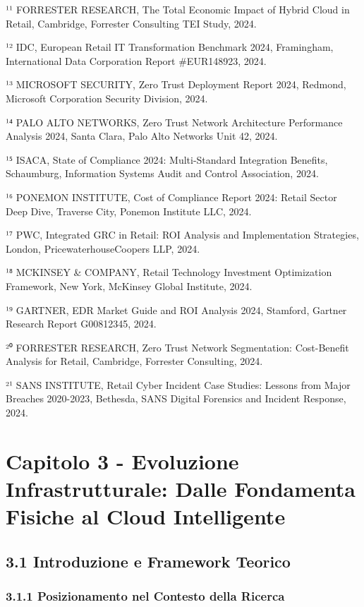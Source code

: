 \documentclass{report}
\begin{document}
¹¹ FORRESTER RESEARCH, The Total Economic Impact of Hybrid Cloud in
Retail, Cambridge, Forrester Consulting TEI Study, 2024.

¹² IDC, European Retail IT Transformation Benchmark 2024, Framingham,
International Data Corporation Report \#EUR148923, 2024.

¹³ MICROSOFT SECURITY, Zero Trust Deployment Report 2024, Redmond,
Microsoft Corporation Security Division, 2024.

¹⁴ PALO ALTO NETWORKS, Zero Trust Network Architecture Performance
Analysis 2024, Santa Clara, Palo Alto Networks Unit 42, 2024.

¹⁵ ISACA, State of Compliance 2024: Multi-Standard Integration Benefits,
Schaumburg, Information Systems Audit and Control Association, 2024.

¹⁶ PONEMON INSTITUTE, Cost of Compliance Report 2024: Retail Sector Deep
Dive, Traverse City, Ponemon Institute LLC, 2024.

¹⁷ PWC, Integrated GRC in Retail: ROI Analysis and Implementation
Strategies, London, PricewaterhouseCoopers LLP, 2024.

¹⁸ MCKINSEY \& COMPANY, Retail Technology Investment Optimization
Framework, New York, McKinsey Global Institute, 2024.

¹⁹ GARTNER, EDR Market Guide and ROI Analysis 2024, Stamford, Gartner
Research Report G00812345, 2024.

²⁰ FORRESTER RESEARCH, Zero Trust Network Segmentation: Cost-Benefit
Analysis for Retail, Cambridge, Forrester Consulting, 2024.

²¹ SANS INSTITUTE, Retail Cyber Incident Case Studies: Lessons from
Major Breaches 2020-2023, Bethesda, SANS Digital Forensics and Incident
Response, 2024.

\section{Capitolo 3 - Evoluzione Infrastrutturale: Dalle Fondamenta
Fisiche al Cloud
Intelligente}\label{capitolo-3---evoluzione-infrastrutturale-dalle-fondamenta-fisiche-al-cloud-intelligente}

\subsection{3.1 Introduzione e Framework
Teorico}\label{introduzione-e-framework-teorico}

\subsubsection{3.1.1 Posizionamento nel Contesto della
Ricerca}\label{posizionamento-nel-contesto-della-ricerca}
\end{document}
